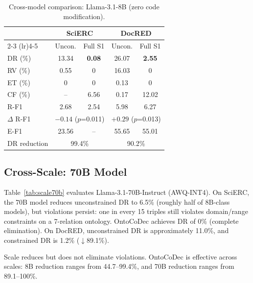 \documentclass[11pt,a4paper]{article}
\newcommand{\ours}{OntoCoDec}
\newcommand{\drsym}{\textsc{DR}}
\newcommand{\rvsym}{\textsc{RV}}
\newcommand{\etsym}{\textsc{ET}}
\newcommand{\cfsym}{\textsc{CF}}
\begin{document}
\begin{table}[t]
\centering
\caption{Cross-model comparison: Llama-3.1-8B (zero code modification).}
\label{tab:crossmodel}
\small
\begin{tabular}{lcccc}
\toprule
& \multicolumn{2}{c}{\textbf{SciERC}} & \multicolumn{2}{c}{\textbf{DocRED}} \\
\cmidrule(lr){2-3} \cmidrule(lr){4-5}
& Uncon. & Full S1 & Uncon. & Full S1 \\
\midrule
\drsym{} (\%) & 13.34 & \textbf{0.08} & 26.07 & \textbf{2.55} \\
\rvsym{} (\%) & 0.55 & 0 & 16.03 & 0 \\
\etsym{} (\%) & 0 & 0 & 0.13 & 0 \\
\cfsym{} (\%) & -- & 6.56 & 0.17 & 12.02 \\
\midrule
R-F1 & 2.68 & 2.54 & 5.98 & 6.27 \\
$\Delta$ R-F1 & \multicolumn{2}{c}{$-0.14$ ($p$=0.011)} & \multicolumn{2}{c}{$+0.29$ ($p$=0.013)} \\
E-F1 & 23.56 & -- & 55.65 & 55.01 \\
\midrule
DR reduction & \multicolumn{2}{c}{99.4\%} & \multicolumn{2}{c}{90.2\%} \\
\bottomrule
\end{tabular}
\end{table}

\subsection{Cross-Scale: 70B Model}
\label{sec:scale}

Table~\ref{tab:scale70b} evaluates Llama-3.1-70B-Instruct (AWQ-INT4). On SciERC, the 70B model reduces unconstrained \drsym{} to 6.5\% (roughly half of 8B-class models), but violations persist: one in every 15 triples still violates domain/range constraints on a 7-relation ontology. \ours{} achieves \drsym{} of 0\% (complete elimination). On DocRED, unconstrained \drsym{} is approximately 11.0\%, and constrained \drsym{} is 1.2\% ($\downarrow$89.1\%).

Scale reduces but does not eliminate violations. \ours{} is effective across scales: 8B reduction ranges from 44.7--99.4\%, and 70B reduction ranges from 89.1--100\%.
\end{document}

